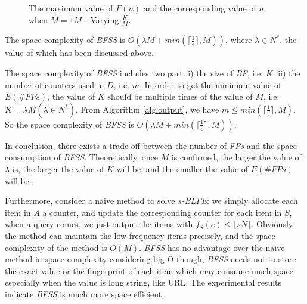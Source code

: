 \documentclass[conference]{IEEEtran}
\begin{document}
\begin{figure}[!t]
	\centering
	\begin{minipage}{0.47\linewidth}
		\centering
	\end{minipage}
	\begin{minipage}{0.47\linewidth}
		\centering
	\end{minipage}
	\caption{The maximum value of $F(n)$ and the corresponding value of $n$ when $M=1M$ - Varying $\frac{K}{M}$.}
	\label{fig:n-F(n)}
\end{figure}

\begin{theorem}\label{thm:4}
The space complexity of \emph{BFSS} is $O(\lambda M+ min(\lceil\frac{1}{\epsilon}\rceil,M))$, where $\lambda\in N^*$, the value of which has been discussed above. 
\end{theorem}
\begin{IEEEproof}
The space complexity of \emph{BFSS} includes two part: i) the size of \emph{BF}, i.e. $K$. ii) the number of counters used in $D$, i.e. $m$. In order to get the minimum value of $E(\#FPs)$, the value of $K$ should be multiple times of the value of $M$, i.e. $K=\lambda M(\lambda\in N^*)$. From Algorithm \ref{alg:output}, we have $m\leq min(\lceil\frac{1}{\epsilon}\rceil,M)$. So the space complexity of \emph{BFSS} is $O(\lambda M+ min(\lceil\frac{1}{\epsilon}\rceil,M))$.
\end{IEEEproof}
In conclusion, there exists a trade off between the number of \emph{FPs} and the space consumption of \emph{BFSS}. Theoretically, once $M$ is confirmed, the larger the value of $\lambda$ is, the larger the value of $K$ will be, and the smaller the value of $E(\#FPs)$ will be.\par
Furthermore, consider a naive method to solve $s$\emph{-BLFE}: we simply allocate each item in $A$ a counter, and update the corresponding counter for each item in $S$, when a query comes, we just output the items with $f_S(e)\leq\lfloor sN\rfloor$. Obviously the method can maintain the low-frequency items precisely, and the space complexity of the method is $O(M)$. \emph{BFSS} has no advantage over the naive method in space complexity considering big O though, \emph{BFSS} needs not to store the exact value or the fingerprint of each item which may consume much space especially when the value is long string, like URL. The experimental results indicate \emph{BFSS} is much more space efficient.
\end{document}
